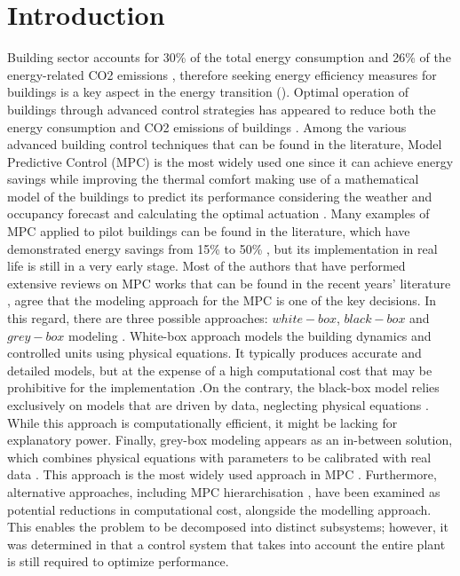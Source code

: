 \section{Introduction}
\label{sec:intro}
Building sector accounts for 30\% of the total energy consumption and 26\% of the energy-related CO2 emissions \cite{IEA2023}, therefore seeking energy efficiency measures for buildings is a key aspect in the energy transition (\cite{EEb2020}). Optimal operation of buildings through advanced control strategies has appeared to reduce both the energy consumption and CO2 emissions of buildings \cite{Stoffel2023}. Among the various advanced building control techniques that can be found in the literature, Model Predictive Control (MPC) is the most widely used one since it can achieve energy savings while improving the thermal comfort making use of a mathematical model of the buildings to predict its performance considering the weather and occupancy forecast and calculating the optimal actuation \cite{Taheri2022}. Many examples of MPC applied to pilot buildings can be found in the literature, which have demonstrated energy savings from 15\% to 50\% \cite{Drgona2020}, but its implementation in real life is still in a very early stage. Most of the authors that have performed extensive reviews on MPC works that can be found in the recent years’ literature \cite{Yao2021}, \cite{Ahmad2021} \cite{Taheri2022} agree that the modeling approach for the MPC is one of the key decisions. In this regard, there are three possible approaches: $white-box$, $black-box$ and $grey-box$ modeling \cite{Kim2022}. White-box approach models the building dynamics and controlled units using physical equations. It typically produces accurate and detailed models, but at the expense of a high computational cost that may be prohibitive for the implementation \cite{Yu2022}.On the contrary, the black-box model relies exclusively on models that are driven by data, neglecting physical equations \cite{Hauge2022}.  While this approach is computationally efficient, it might be lacking for explanatory power. Finally, grey-box modeling appears as an in-between solution, which combines physical equations with parameters to be calibrated with real data \cite{Kumar2023}. This approach is the most widely used approach in MPC \cite{Serale2018}. Furthermore, alternative approaches, including MPC hierarchisation \cite{Raghuraman2020}, have been examined as potential reductions in computational cost, alongside the modelling approach. This enables the problem to be decomposed into distinct subsystems; however, it was determined in \cite{Camponogara2021} that a control system that takes into account the entire plant is still required to optimize performance.

